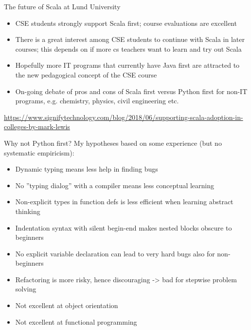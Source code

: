 \documentclass[aspectratio=169]{beamer}
\newenvironment{Slide}[1]%
  {\begin{frame}[environment=Slide]{#1}}
  {\end{frame}}%
\begin{document}
\begin{Slide}{The future of Scala at Lund University}
\begin{itemize}
  \item CSE students strongly support Scala first; course evaluations are excellent
  \item There is a great interest among CSE students to continue with Scala in later courses; this depends on if more cs teachers want to learn and try out Scala 
  \item Hopefully more IT programs that currently have Java first are attracted to the new pedagogical concept of the CSE course
  \item On-going debate of pros and cons of Scala first versus Python first for non-IT programs, e.g. chemistry, physics, civil engineering etc.
\end{itemize}  
\vfill \url{https://www.signifytechnology.com/blog/2018/06/supporting-scala-adoption-in-colleges-by-mark-lewis}
\end{Slide}

\begin{Slide}{Why not Python first?}
  My hypotheses based on some experience (but no systematic empiricism):
\begin{itemize}
  \item Dynamic typing means less help in finding bugs
  \item No ''typing dialog'' with a compiler means less conceptual learning
  \item Non-explicit types in function defs is less efficient when learning abstract thinking
  \item Indentation syntax with silent begin-end makes nested blocks obscure to beginners
  \item No explicit variable declaration can lead to very hard bugs also for non-beginners 
  \item Refactoring is more risky, hence discouraging -> bad for stepwise problem solving
  \item Not excellent at object orientation
  \item Not excellent at functional programming
\end{itemize}  
\end{Slide}
\end{document}
